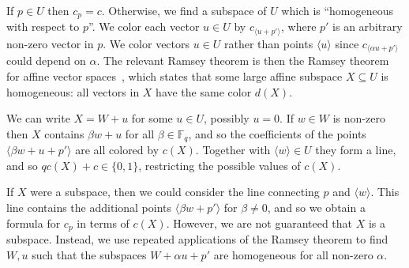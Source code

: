 \documentclass{article}
\theoremstyle{definition}
\begin{document}
If $p \in U$ then $c_p = c$. Otherwise, we find a subspace of $U$ which is ``homogeneous with respect to $p$''. We color each vector $u \in U$ by $c_{\langle u + p' \rangle}$, where $p'$ is an arbitrary non-zero vector in $p$. We color vectors $u \in U$ rather than points $\langle u \rangle$ since $c_{\langle \alpha u + p' \rangle}$ could depend on $\alpha$. The relevant Ramsey theorem is then the Ramsey theorem for affine vector spaces~\cite{GLR72}, which states that some large affine subspace $X \subseteq U$ is homogeneous: all vectors in $X$ have the same color $d(X)$.

We can write $X = W + u$ for some $u \in U$, possibly $u = 0$. If $w \in W$ is non-zero then $X$ contains $\beta w + u$ for all $\beta \in \mathbb{F}_q$, and so the coefficients of the points $\langle \beta w + u + p' \rangle$ are all colored by $c(X)$. Together with $\langle w \rangle \in U$ they form a line, and so $qc(X) + c \in \{0, 1\}$, restricting the possible values of $c(X)$.

If $X$ were a subspace, then we could consider the line connecting $p$ and $\langle w \rangle$. This line contains the additional points $\langle \beta w + p' \rangle$ for $\beta \ne 0$, and so we obtain a formula for $c_p$ in terms of $c(X)$. However, we are not guaranteed that $X$ is a subspace. Instead, we use repeated applications of the Ramsey theorem to find $W,u$ such that the subspaces $W + \alpha u + p'$ are homogeneous for all non-zero $\alpha$.
\end{document}
